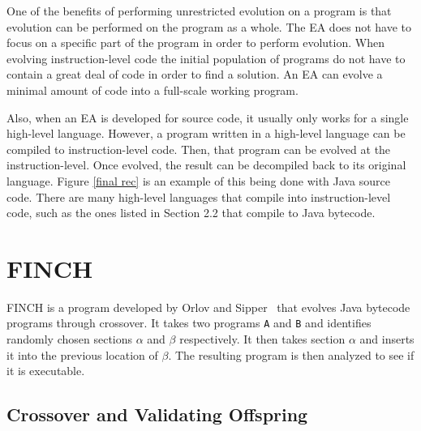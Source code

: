\documentclass{sig-alternate}
\begin{document}
One of the benefits of performing unrestricted evolution on a program is that evolution can be performed on the program as a whole. The EA does not have to focus on a specific part of the program in order to perform evolution. When evolving instruction-level code the initial population of programs do not have to contain a great deal of code in order to find a solution. An EA can evolve a minimal amount of code into a full-scale working program.\par

Also, when an EA is developed for source code, it usually only works for a single high-level language. However, a program written in a high-level language can be compiled to instruction-level code. Then, that program can be evolved at the instruction-level. Once evolved, the result can be decompiled back to its original language. Figure \ref{final rec} is an example of this being done with Java source code. There are many high-level languages that compile into instruction-level code, such as the ones listed in Section 2.2 that compile to Java bytecode.

\section{FINCH}
FINCH is a program developed by Orlov and Sipper~\cite{FINCH2:2009,FINCH:2011} that evolves Java bytecode programs through crossover. It takes two programs \texttt{A} and \texttt{B} and identifies randomly chosen sections $\alpha$ and $\beta$ respectively. It then takes section $\alpha$ and inserts it into the previous location of $\beta$. The resulting program is then analyzed to see if it is executable.

\subsection{Crossover and Validating Offspring}
\end{document}
